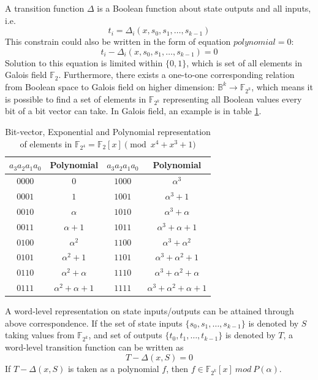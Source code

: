 A transition function $\Delta$ is a Boolean function about state outputs and all inputs, i.e.
\begin{displaymath}
t_i = \Delta_i(x, s_0, s_1, \dots, s_{k-1})
\end{displaymath}
This constrain could also be written in the form of equation $polynomial = 0$:
\begin{displaymath}
t_i - \Delta_i(x, s_0, s_1, \dots, s_{k-1}) = 0
\end{displaymath}
Solution to this equation is limited within $\{0, 1\}$, which is set of all elements in Galois field $\mathbb{F}_2$.
Furthermore, there exists a one-to-one corresponding relation from Boolean space to Galois field on higher dimension: 
$\mathbb{B}^k \to \mathbb{F}_{2^k}$, which means it is possible to find a set of elements in $\mathbb{F}_{2^k}$ representing
all Boolean values every bit of a bit vector can take. In Galois field, an example is in table \ref{table:booltogalois}.
\begin{table}[tb]
\centering
\caption{Bit-vector, Exponential and Polynomial representation of
elements in  ${\mathbb{F}}_{2^4} = {\mathbb{F}}_2[x]
\pmod{x^4+x^3+1}$}
\begin{tabular}{|c|c||c|c|} 
\hline
$a_3a_2a_1a_0$ & Polynomial     &$a_3a_2a_1a_0$ & Polynomial  \\
\hline
$0000$        & $0$           & $1000$  &$\alpha^3$\\
\hline
$0001$        & $1$           & $1001$  & $\alpha^3 + 1$\\
\hline
$0010$        &  $\alpha$       & $1010$ & $\alpha^3 + \alpha$  \\
\hline
$0011$        &  $\alpha + 1$   & $1011$ &  $\alpha^3+\alpha+1$\\
\hline
$0100$        &  $\alpha^2$     &  $1100$ &  $\alpha^3 + \alpha^2$\\
\hline
$0101$        & $\alpha^2 + 1$ & $1101$  & $\alpha^3+\alpha^2+1$\\
\hline
$0110$        &  $\alpha^2 + \alpha$ & $1110$ &  $\alpha^3+\alpha^2+\alpha$\\
\hline
$0111$        & $\alpha^2+\alpha+1$ & $1111$ & $\alpha^3+\alpha^2+\alpha+1$\\
\hline
\end{tabular}
\label{table:booltogalois}  
\end{table}
A word-level representation on state inputs/outputs can be attained through above correspondence. If the set of 
state inputs $\{s_0, s_1, \dots, s_{k-1}\}$ is denoted by $S$ taking values from $\mathbb{F}_{2^k}$, and
set of outputs $\{t_0, t_1, \dots, t_{k-1}\}$ is denoted by $T$, a word-level transition function can be written as
\begin{displaymath}
T - \Delta(x, S) = 0
\end{displaymath}
If $T - \Delta(x, S)$ is taken as a polynomial $f$, then $f \in \mathbb{F}_{2^k}[x]\ mod\ P(\alpha)$.
